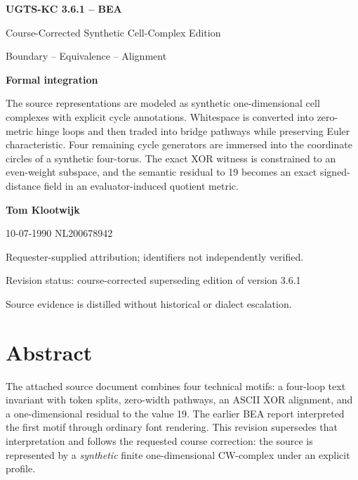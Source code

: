 \documentclass[10pt,a4paper]{article}
\begin{document}

\begin{titlepage}
\pagecolor{UGTSNavy}
\color{white}
\vspace*{10mm}
{\sffamily\bfseries\fontsize{34}{39}\selectfont UGTS-KC 3.6.1 -- BEA\par}
\vspace{5mm}
{\sffamily\fontsize{21}{25}\selectfont Course-Corrected Synthetic Cell-Complex Edition\par}
\vspace{6mm}
{\sffamily\large Boundary -- Equivalence -- Alignment\par}
\vspace{13mm}

\begin{tcolorbox}[enhanced,colback=white,colframe=UGTSTeal,boxrule=1.2pt,arc=2mm,left=5mm,right=5mm,top=4mm,bottom=4mm]
\color{UGTSDark}
\textbf{Formal integration}\par
The source representations are modeled as synthetic one-dimensional cell complexes with explicit cycle annotations. Whitespace is converted into zero-metric hinge loops and then traded into bridge pathways while preserving Euler characteristic. Four remaining cycle generators are immersed into the coordinate circles of a synthetic four-torus. The exact XOR witness is constrained to an even-weight subspace, and the semantic residual to 19 becomes an exact signed-distance field in an evaluator-induced quotient metric.
\end{tcolorbox}

\vfill
{\sffamily\Large\bfseries Tom Klootwijk\par}
{\sffamily\large 10-07-1990 \quad NL200678942\par}
\vspace{3mm}
{\sffamily\small Requester-supplied attribution; identifiers not independently verified.\par}
\vspace{10mm}
{\sffamily\small Revision status: course-corrected superseding edition of version 3.6.1\par}
{\sffamily\small Source evidence is distilled without historical or dialect escalation.\par}
\end{titlepage}
\nopagecolor
\color{UGTSDark}

\section*{Abstract}
The attached source document combines four technical motifs: a four-loop text invariant with token splits, zero-width pathways, an ASCII XOR alignment, and a one-dimensional residual to the value 19. The earlier BEA report interpreted the first motif through ordinary font rendering. This revision supersedes that interpretation and follows the requested course correction: the source is represented by a \emph{synthetic} finite one-dimensional CW-complex under an explicit profile.
\end{document}
